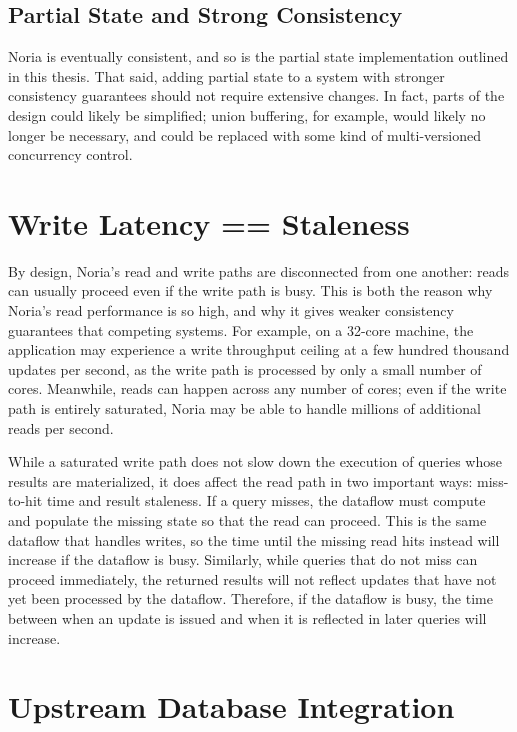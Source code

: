 \subsection{Partial State and Strong Consistency}

Noria is eventually consistent, and so is the partial state implementation
outlined in this thesis. That said, adding partial state to a system with
stronger consistency guarantees should not require extensive changes. In fact,
parts of the design could likely be simplified; union buffering, for example,
would likely no longer be necessary, and could be replaced with some kind of
multi-versioned concurrency control.

\section{Write Latency == Staleness}

By design, Noria's read and write paths are disconnected from one another: reads
can usually proceed even if the write path is busy. This is both the reason why
Noria's read performance is so high, and why it gives weaker consistency
guarantees that competing systems. For example, on a 32-core machine, the
application may experience a write throughput ceiling at a few hundred thousand
updates per second, as the write path is processed by only a small number of
cores. Meanwhile, reads can happen across any number of cores; even if the write
path is entirely saturated, Noria may be able to handle millions of additional
reads per second.

While a saturated write path does not slow down the execution of queries whose
results are materialized, it does affect the read path in two important ways:
miss-to-hit time and result staleness. If a query misses, the dataflow must
compute and populate the missing state so that the read can proceed. This is the
same dataflow that handles writes, so the time until the missing read hits
instead will increase if the dataflow is busy. Similarly, while queries that do
not miss can proceed immediately, the returned results will not reflect updates
that have not yet been processed by the dataflow. Therefore, if the dataflow is
busy, the time between when an update is issued and when it is reflected in
later queries will increase.

\section{Upstream Database Integration}

